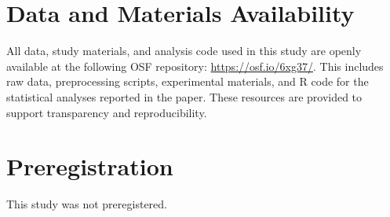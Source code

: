 \section{Data and Materials Availability}

All data, study materials, and analysis code used in this study are openly available at the following OSF repository: \url{https://osf.io/6xg37/}. This includes raw data, preprocessing scripts, experimental materials, and R code for the statistical analyses reported in the paper. These resources are provided to support transparency and reproducibility.

\section{Preregistration}

This study was not preregistered.
